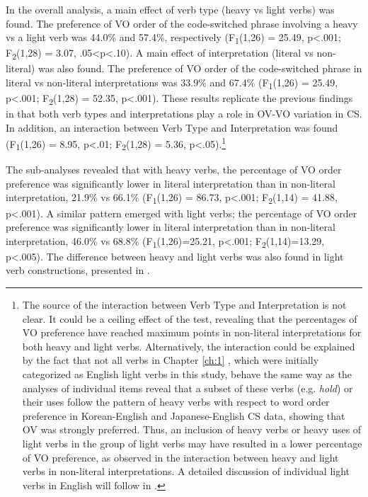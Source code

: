 In the overall analysis, a main effect of verb type (heavy vs light verbs) was found. The preference of \ac{VO} order of the code-switched phrase involving a heavy vs a light verb was 44.0\% and 57.4\%, respectively (F\textsubscript{1}(1,26) = 25.49, p<.001; F\textsubscript{2}(1,28) = 3.07, .05<p<.10). A main effect of interpretation (literal vs non-literal) was also found. The preference of \ac{VO} order of the code-switched phrase in literal vs non-literal interpretations was 33.9\% and 67.4\% (F\textsubscript{1}(1,26) = 25.49, p<.001; F\textsubscript{2}(1,28) = 52.35, p<.001). These results replicate the previous findings in \citet{Shim2011} that both verb types and interpretations play a role in \ac{OV}-\ac{VO} variation in \ac{CS}. In addition, an interaction between Verb Type and Interpretation was found (F\textsubscript{1}(1,26) = 8.95, p<.01; F\textsubscript{2}(1,28) = 5.36, p<.05).\footnote{The source of the interaction between Verb Type and Interpretation is not clear. It could be a ceiling effect of the test, revealing that the percentages of \ac{VO} preference have reached maximum points in non-literal interpretations for both heavy and light verbs. Alternatively, the interaction could be explained by the fact that not all verbs in Chapter \ref{ch:1} , which were initially categorized as English light verbs in this study, behave the same way as the analyses of individual items reveal that a subset of these verbs (e.g. \textit{hold}) or their uses follow the pattern of heavy verbs with respect to word order preference in Korean-English and Japanese-English \ac{CS} data, showing that \ac{OV} was strongly preferred. Thus, an inclusion of heavy verbs or heavy uses of light verbs in the group of light verbs may have resulted in a lower percentage of \ac{VO} preference, as observed in the interaction between heavy and light verbs in non-literal interpretations. A detailed discussion of individual light verbs in English will follow in .}

The sub-analyses revealed that with heavy verbs, the percentage of \ac{VO} order preference was significantly lower in literal interpretation than in non-literal interpretation, 21.9\% vs 66.1\% (F\textsubscript{1}(1,26) = 86.73, p<.001; F\textsubscript{2}(1,14) = 41.88, p<.001). A similar pattern emerged with light verbs; the percentage of \ac{VO} order preference was significantly lower in literal interpretation than in non-literal interpretation, 46.0\% vs 68.8\% (F\textsubscript{1}(1,26)=25.21, p<.001; F\textsubscript{2}(1,14)=13.29, p<.005). The difference between heavy and light verbs was also found in light verb constructions, presented in .

